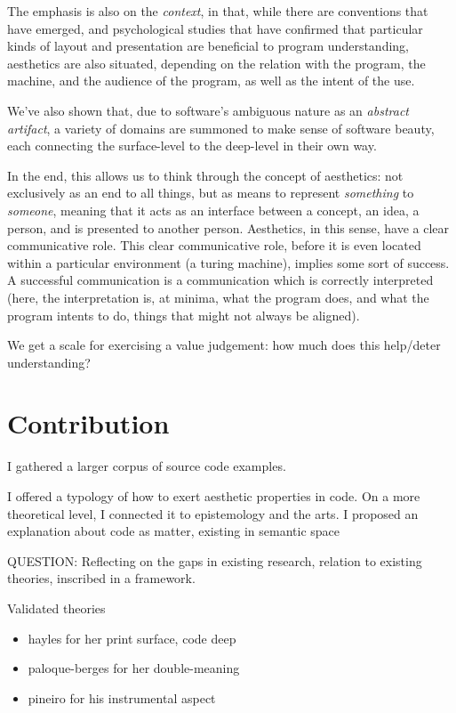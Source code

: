 The emphasis is also on the \emph{context}, in that, while there are conventions that have emerged, and psychological studies that have confirmed that particular kinds of layout and presentation are beneficial to program understanding, aesthetics are also situated, depending on the relation with the program, the machine, and the audience of the program, as well as the intent of the use.

We've also shown that, due to software's ambiguous nature as an \emph{abstract artifact}, a variety of domains are summoned to make sense of software beauty, each connecting the surface-level to the deep-level in their own way.

In the end, this allows us to think through the concept of aesthetics: not exclusively as an end to all things, but as means to represent \emph{something} to \emph{someone}, meaning that it acts as an interface between a concept, an idea, a person, and is presented to another person. Aesthetics, in this sense, have a clear communicative role. This clear communicative role, before it is even located within a particular environment (a turing machine), implies some sort of success. A successful communication is a communication which is correctly interpreted (here, the interpretation is, at minima, what the program does, and what the program intents to do, things that might not always be aligned).

We get a scale for exercising a value judgement: how much does this help/deter understanding?

\section{Contribution}  %

I gathered a larger corpus of source code examples.

I offered a typology of how to exert aesthetic properties in code.
On a more theoretical level, I connected it to epistemology and the arts.
I proposed an explanation about code as matter, existing in semantic space

QUESTION: Reflecting on the gaps in existing research, relation to existing theories, inscribed in a framework.

Validated theories
\begin{itemize}
    \item hayles for her print surface, code deep
    \item paloque-berges for her double-meaning
    \item pineiro for his instrumental aspect
\end{itemize}

